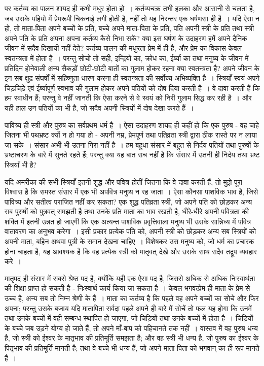 पर कर्तव्य का पालन शायद ही कभी मधुर होता हो~। कर्तव्यचक्र तभी हलका और आसानी से चलता है, जब उसके पहियो में प्रेमरूपी चिकनाई लगी होती है, नहीं तो यह निरन्तर एक घर्षणसा ही है~। यदि ऐसा न हो, तो माता-पिता अपने बच्चों के प्रति, बच्चे अपने माता-पिता के प्रति, पति अपनी स्त्री के प्रति तथा स्त्री अपने पति के प्रति अपना अपना कर्तव्य कैसे निभा सकें? क्या इस घर्षण के उदाहरण हमें अपने दैनिक जीवन में सदैव दिखायी नहीं देते? कर्तव्य पालन की मधुरता प्रेम में ही है, और प्रेम का विकास केवल स्वतन्त्रता में होता है~। परन्तु सोचो तो सही, इन्द्रियों का, क्रोध का, ईर्ष्या का तथा मनुष्य के जीवन में प्रतिदिन होनेवाली अन्य सैकड़ों छोटी-छोटी बातों का गुलाम होकर रहना क्या स्वतन्त्रता है? अपने जीवन के इन सब क्षुद्र संघर्षों में सहिष्णुता धारण करना ही स्वतन्त्रता की सर्वोच्च अभिव्यक्ति है~। स्त्रियाँ स्वयं अपने चिड़चिड़े एवं ईर्ष्यापूर्ण स्वभाव की गुलाम होकर अपने पतियों को दोष दिया करती है~। वे दावा करती हैं कि हम स्वाधीन हैं; परन्तु वे नहीं जानती कि ऐसा करने से वे स्वयं को निरी गुलाम सिद्ध कर रही है~। और यही हाल उन पतियों का भी है, जो सदैव अपनी स्त्रियों में दोष देखा करते हैं~।

पावित्र्य ही स्त्री और पुरुष का सर्वप्रथम धर्म है~। ऐसा उदाहरण शायद ही कहीं हो कि एक पुरुष - वह चाहे जितना भी पथभ्रष्ट क्यों न हो गया हो - अपनी नम्र, प्रेमपूर्ण तथा पतिव्रता स्त्री द्वारा ठीक रास्ते पर न लाया जा सके~। संसार अभी भी उतना गिरा नहीं है~। हम बहुधा संसार में बहुत से निर्दय पतियों तथा पुरुषों के भ्रष्टाचरण के बारे में सुनते रहते हैं; परन्तु क्या यह बात सच नहीं है कि संसार में उतनी ही निर्दय तथा भ्रष्ट स्त्रियाँ भी है?

यदि अमरीका की सभी स्त्रियाँ इतनी शुद्ध और पवित्र होतीं जितना कि वे दावा करती हैं, तो मुझे पूरा विश्वास है कि समस्त संसार में एक भी अपवित्र मनुष्य न रह जाता~। ऐसा कौनसा पाशविक भाव है, जिसे पावित्र्य और सतीत्व पराजित नहीं कर सकता? एक शुद्ध पतिव्रता स्त्री, जो अपने पति को छोड़कर अन्य सब पुरुषों को पुत्रवत् समझती है तथा उनके प्रति माता का भाव रखती है, धीरे-धीरे अपनी पवित्रता की शक्ति में इतनी उन्नत हो जाएगी कि एक अत्यन्त पाशविक प्रवृत्तिवाला मनुष्य भी उसके सान्निध्य में पवित्र वातावरण का अनुभव करेगा~। इसी प्रकार प्रत्येक पति को, अपनी स्त्री को छोड़कर अन्य सब स्त्रियों को अपनी माता, बहिन अथवा पुत्री के समान देखना चाहिए~। विशेषकर उस मनुष्य को, जो धर्म का प्रचारक होना चाहता है, यह आवश्यक है कि वह प्रत्येक स्त्री को मातृवत् देखे और उसके साथ सदैव तद्रूप व्यवहार करे~।

मातृपद ही संसार में सबसे श्रेष्ठ पद है, क्योंकि यही एक ऐसा पद है, जिससे अधिक से अधिक निःस्वार्थता की शिक्षा प्राप्त हो सकती है - निःस्वार्थ कार्य किया जा सकता है~। केवल भगवत्प्रेम ही माता के प्रेम से उच्च है, अन्य सब तो निम्न श्रेणी के हैं~। माता का कर्तव्य है कि पहले वह अपने बच्चों का सोचे और फिर अपना; परन्तु उसके बजाय यदि मातापिता सर्वदा पहले अपने ही बारे में सोचें तो फल यह होगा कि उनमें तथा उनके बच्चों में वही सम्बन्ध स्थापित हो जाएगा, जो चिड़ियों तथा उनके बच्चों में होता है~। चिड़ियों के बच्चे जब उड़ने योग्य हो जाते हैं, तो अपने माँ-बाप को पहिचानते तक नहीं~। वास्तव में वह पुरुष धन्य है, जो स्त्री को ईश्वर के मातृभाव की प्रतिमूर्ति समझता है; और वह स्त्री भी धन्य है, जो पुरुष का ईश्वर के पितृभाव की प्रतिमूर्ति मानती है; तथा वे बच्चे भी धन्य हैं, जो अपने माता-पिता को भगवान् का ही रूप मानते हैं~।

